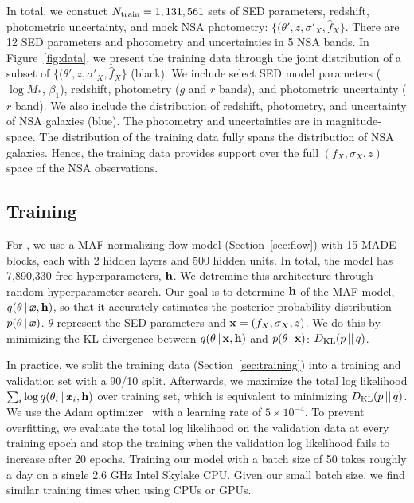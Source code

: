 In total, we constuct $N_{\rm train} = 1,131,561$ sets of SED parameters,
redshift, photometric uncertainty, and mock NSA photometry: 
$\{(\theta', z, \sigma'_X, \hat{f}_X \}$.
There are 12 SED parameters and photometry and uncertainties in 5 NSA bands. 
In Figure~\ref{fig:data}, we present the training data through the joint
distribution of a subset of $\{(\theta', z, \sigma'_X, \hat{f}_X \}$ (black).
We include select SED model parameters ($\log M_*$, $\beta_1$), redshift,
photometry ($g$ and $r$ bands), and photometric uncertainty ($r$ band).
We also include the distribution of redshift, photometry, and uncertainty of
NSA galaxies (blue).
The photometry and uncertainties are in magnitude-space. 
The distribution of the training data fully spans the distribution of NSA
galaxies.
Hence, the training data provides support over the full $(f_X, \sigma_X, z)$
space of the NSA observations. 

\subsection{Training \sedflow} \label{sec:anpe_train}
For \sedflow, we use a MAF normalizing flow model (Section~\ref{sec:flow}) with 
15 MADE blocks, each with 2 hidden layers and 500 hidden units.
In total, the model has 7,890,330 free hyperparameters, ${\bf h}$. 
We detremine this architecture through random hyperparameter search. 
Our goal is to determine ${\bf h}$ of the MAF model, 
$q(\theta\,|\,\textbf{\textit{x}}, {\bf h})$, so that it accurately estimates the
posterior probability distribution $p(\theta\,|\,\textbf{\textit{x}})$. 
$\theta$ represent the SED parameters and ${\bf x} = (f_X, \sigma_X, z)$.
We do this by minimizing the KL divergence between 
$q(\theta\,|\,{\bf x}, {\bf h})$ and $p(\theta\,|\,{\bf x})$:
$D_{\rm KL} (p\,||\,q)$. 

In practice, we split the training data (Section~\ref{sec:training}) into a
training and validation set with a 90/10 split. 
Afterwards, we maximize the total log likelihood $\sum_i \log q(\theta_i\,|\,
\textbf{\textit{x}}_i, \bf{h})$ over training set, which is equivalent to minimizing 
$D_{\rm KL} (p\,||\,q)$.
We use the {\sc Adam} optimizer~\citep{kingma2017} with a learning rate of $5\times10^{-4}$. 
To prevent overfitting, we evaluate the total log likelihood on the validation
data at every training epoch and stop the training when the validation log
likelihood fails to increase after 20 epochs.  
Training our model with a batch size of 50 takes roughly a day on a single 2.6
GHz Intel Skylake CPU. 
Given our small batch size, we find similar training times when using CPUs or
GPUs. 
